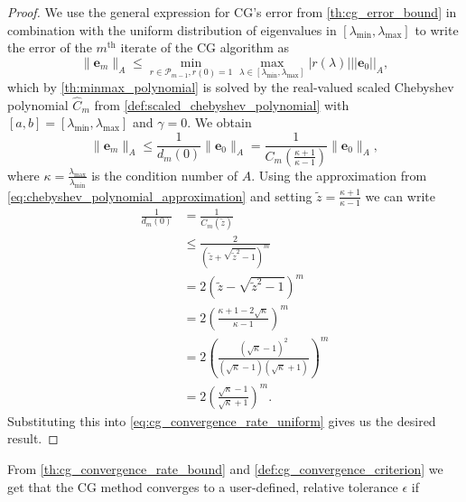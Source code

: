 \begin{proof}
  We use the general expression for CG's error from \cref{th:cg_error_bound} in combination with the uniform distribution of eigenvalues in $[\lambda_{\text{min}}, \lambda_{\text{max}}]$ to write the error of the $m^{\text{th}}$ iterate of the CG algorithm as
  \begin{equation}
    \|\mathbf{e}_m\|_A \leq \min_{r \in \mathcal{P}_{m-1}, r(0) = 1} \max_{\lambda \in [\lambda_{\text{min}}, \lambda_{\text{max}}]} |r(\lambda)| ||\mathbf{e}_0||_A,
  \end{equation}
  which by \cref{th:minmax_polynomial} is solved by the real-valued scaled Chebyshev polynomial $\hat{C}_m$ from \cref{def:scaled_chebyshev_polynomial} with $[a,b] = [\lambda_{\text{min}},\lambda_{\text{max}}]$ and $\gamma=0$. We obtain
  \begin{equation}
    \|\mathbf{e}_m\|_A \leq \frac{1}{d_m(0)}\|\mathbf{e}_0\|_A =\frac{1}{C_m(\frac{\kappa + 1}{\kappa - 1})}\|\mathbf{e}_0\|_A,
    \label{eq:cg_convergence_rate_uniform}
  \end{equation}
  where $\kappa = \frac{\lambda_{\text{max}}}{\lambda_{\text{min}}}$ is the condition number of $A$. Using the approximation from \cref{eq:chebyshev_polynomial_approximation} and setting $\tilde{z} = \frac{\kappa + 1}{\kappa -1}$ we can write
  \begin{align*}
    \frac{1}{d_m(0)} & = \frac{1}{C_m(\tilde{z})}                                                            \\
                     & \leq \frac{2}{\left(\tilde{z} + \sqrt{\tilde{z}^2-1}\right)^m}                        \\
                     & =2\left(\tilde{z} - \sqrt{\tilde{z}^2-1}\right)^m                                     \\
                     & =2\left(\frac{\kappa + 1 - 2\sqrt{\kappa}}{\kappa - 1}\right)^m                       \\
                     & =2\left(\frac{(\sqrt{\kappa} - 1)^2}{(\sqrt{\kappa} - 1)(\sqrt{\kappa} + 1)}\right)^m \\
                     & =2\left(\frac{\sqrt{\kappa} - 1}{\sqrt{\kappa} + 1}\right)^{m}.
  \end{align*}
  Substituting this into \cref{eq:cg_convergence_rate_uniform} gives us the desired result.
\end{proof}
From \cref{th:cg_convergence_rate_bound} and \cref{def:cg_convergence_criterion} we get that the CG method converges to a user-defined, relative tolerance $\epsilon$ if
